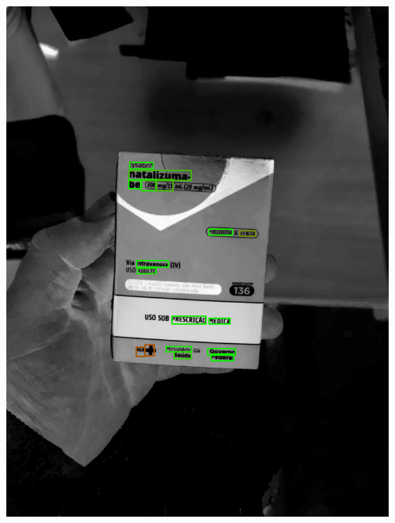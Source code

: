 \begin{frame}
\begin{columns}
\begin{column}{0.24\textwidth}
			\includegraphics[height=0.35\textheight]{../pictures/tysabri_cmyk_y_only_boxes.jpg}
		\end{column}
		\begin{column}{0.24\textwidth}\centering

\end{column}
\end{columns}
\end{frame}
